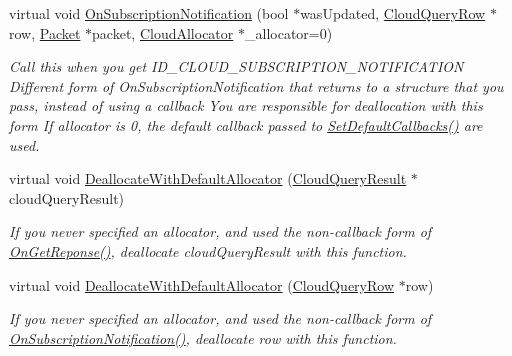 \begin{DoxyCompactItemize}
virtual void \hyperlink{class_rak_net_1_1_cloud_client_a554a5cd02236c60b22ab54020897c722}{On\-Subscription\-Notification} (bool $\ast$was\-Updated, \hyperlink{struct_rak_net_1_1_cloud_query_row}{Cloud\-Query\-Row} $\ast$row, \hyperlink{struct_rak_net_1_1_packet}{Packet} $\ast$packet, \hyperlink{class_rak_net_1_1_cloud_allocator}{Cloud\-Allocator} $\ast$\-\_\-allocator=0)
\begin{DoxyCompactList}\small\item\em Call this when you get I\-D\-\_\-\-C\-L\-O\-U\-D\-\_\-\-S\-U\-B\-S\-C\-R\-I\-P\-T\-I\-O\-N\-\_\-\-N\-O\-T\-I\-F\-I\-C\-A\-T\-I\-O\-N Different form of On\-Subscription\-Notification that returns to a structure that you pass, instead of using a callback You are responsible for deallocation with this form If {\itshape allocator} is 0, the default callback passed to \hyperlink{class_rak_net_1_1_cloud_client_a27fd20daa3c333eeaca61ac07a43836a}{Set\-Default\-Callbacks()} are used. \end{DoxyCompactList}\item 
\hypertarget{class_rak_net_1_1_cloud_client_a48a4b7a6800327507de447275a8c506c}{virtual void \hyperlink{class_rak_net_1_1_cloud_client_a48a4b7a6800327507de447275a8c506c}{Deallocate\-With\-Default\-Allocator} (\hyperlink{struct_rak_net_1_1_cloud_query_result}{Cloud\-Query\-Result} $\ast$cloud\-Query\-Result)}\label{class_rak_net_1_1_cloud_client_a48a4b7a6800327507de447275a8c506c}

\begin{DoxyCompactList}\small\item\em If you never specified an allocator, and used the non-\/callback form of \hyperlink{class_rak_net_1_1_cloud_client_a2142bcf4cd9484ee3c3e897d5fde5e55}{On\-Get\-Reponse()}, deallocate cloud\-Query\-Result with this function. \end{DoxyCompactList}\item 
\hypertarget{class_rak_net_1_1_cloud_client_ae8c440eaef0705535eb5ea24e2b43493}{virtual void \hyperlink{class_rak_net_1_1_cloud_client_ae8c440eaef0705535eb5ea24e2b43493}{Deallocate\-With\-Default\-Allocator} (\hyperlink{struct_rak_net_1_1_cloud_query_row}{Cloud\-Query\-Row} $\ast$row)}\label{class_rak_net_1_1_cloud_client_ae8c440eaef0705535eb5ea24e2b43493}

\begin{DoxyCompactList}\small\item\em If you never specified an allocator, and used the non-\/callback form of \hyperlink{class_rak_net_1_1_cloud_client_aefd840feec9d674e2066dd491d61fa62}{On\-Subscription\-Notification()}, deallocate row with this function. \end{DoxyCompactList}\end{DoxyCompactItemize}
